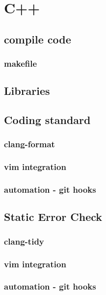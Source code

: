 \chapter{C++}

\section{compile code} 

\subsection{makefile} 

\section{Libraries} 

\section{Coding standard} 
\subsection{clang-format}
\subsection{vim integration}
\subsection{automation - git hooks}


\section{Static Error Check} 
\subsection{clang-tidy}
\subsection{vim integration}
\subsection{automation - git hooks}
